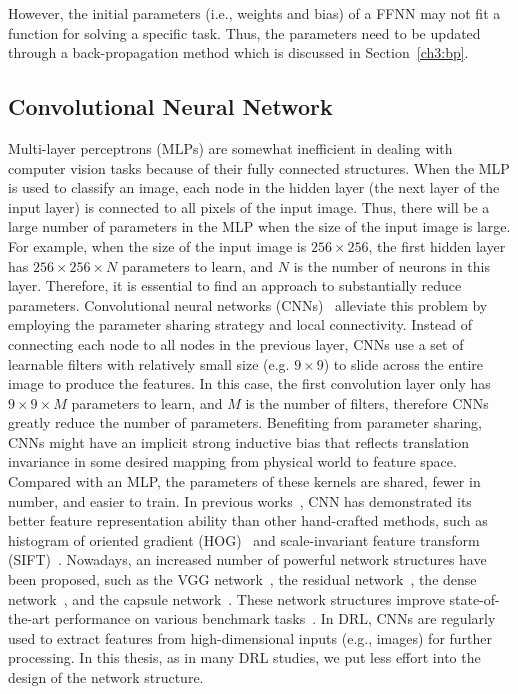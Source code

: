 However, the initial parameters (i.e., weights and bias) of a FFNN may not fit a function for solving a specific task. Thus, the parameters need to be updated through a back-propagation method which is discussed in Section~\ref{ch3:bp}.
\subsection{Convolutional Neural Network}
Multi-layer perceptrons (MLPs) are somewhat inefficient in dealing with computer vision tasks because of their fully connected structures. When the MLP is used to classify an image, each node in the hidden layer (the next layer of the input layer) is connected to all pixels of the input image. Thus, there will be a large number of parameters in the MLP when the size of the input image is large. For example, when the size of the input image is $256\times256$, the first hidden layer has $256\times256\times N$ parameters to learn, and $N$ is the number of neurons in this layer. Therefore, it is essential to find an approach to substantially reduce parameters. Convolutional neural networks (CNNs)~\cite{lecun1998gradient} alleviate this problem by employing the parameter sharing strategy and local connectivity. Instead of connecting each node to all nodes in the previous layer, CNNs use a set of learnable filters with relatively small size (e.g. $9\times9$) to slide across the entire image to produce the features. In this case, the first convolution layer only has $9\times9\times M$ parameters to learn, and $M$ is the number of filters, therefore CNNs greatly reduce the number of parameters. Benefiting from parameter sharing, CNNs might have an implicit strong inductive bias that reflects translation invariance in some desired mapping from physical world to feature space. Compared with an MLP, the parameters of these kernels are shared, fewer in number, and easier to train. In previous works~\cite{krizhevsky2012imagenet,girshick2014rich,detone2016deep}, CNN has demonstrated its better feature representation ability than other hand-crafted methods, such as histogram of oriented gradient (HOG)~\cite{dalal2005histograms} and scale-invariant feature transform (SIFT)~\cite{lowe2004distinctive}. Nowadays, an increased number of powerful network structures have been proposed, such as the VGG network~\cite{simonyan2014very}, the residual network~\cite{he2016deep}, the dense network~\cite{huang2017densely}, and the capsule network~\cite{sabour2017dynamic}. These network structures improve state-of-the-art performance on various benchmark tasks~\cite{deng2009imagenet,everingham2010pascal}. In DRL, CNNs are regularly used to extract features from high-dimensional inputs (e.g., images) for further processing. In this thesis, as in many DRL studies, we put less effort into the design of the network structure.

